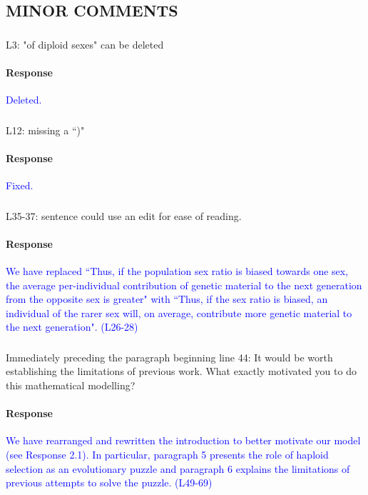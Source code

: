 \documentclass[10pt,letterpaper]{article}
\begin{document}
\subsection{MINOR COMMENTS}

\noindent\subsubsection{}
L3: "of diploid sexes" can be deleted

\noindent\paragraph{Response}
\textcolor{blue}{Deleted.}

\noindent\subsubsection{}
L12: missing a ``)"

\noindent\paragraph{Response}
\textcolor{blue}{Fixed.}

\noindent\subsubsection{}
L35-37: sentence could use an edit for ease of reading.

\noindent\paragraph{Response}
\textcolor{blue}{We have replaced ``Thus, if the population sex ratio is biased towards one sex, the average per-individual contribution of genetic material to the next generation from the opposite sex is greater" with ``Thus, if the sex ratio is biased, an individual of the rarer sex will, on average, contribute more genetic material to the next generation". (L26-28)}

\noindent\subsubsection{}
Immediately preceding the paragraph beginning line 44: It would be worth establishing the limitations of previous work. What exactly motivated you to do this mathematical modelling?

\noindent\paragraph{Response}
\textcolor{blue}{We have rearranged and rewritten the introduction to better motivate our model (see Response 2.1). In particular, paragraph 5 presents the role of haploid selection as an evolutionary puzzle and paragraph 6 explains the limitations of previous attempts to solve the puzzle. (L49-69)}
\end{document}
